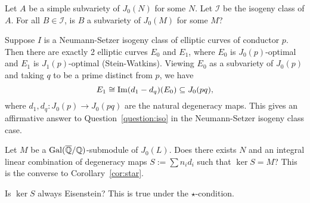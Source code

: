 \documentclass{article}
\begin{document}
\begin{question}
    \label{question:iso}
    Let $A$ be a simple subvariety of $J_0(N)$ for some $N$. Let $\mathcal{I}$
    be the isogeny class of $A$. For all $B\in \mathcal{I}$, is $B$ a
    subvariety of $J_0(M)$ for some $M$?
\end{question}

\begin{example}
    Suppose $I$ is a Neumann-Setzer isogeny class of elliptic curves of
    conductor $p$. Then there are exactly 2 elliptic curves $E_0$ and $E_1$,
    where $E_0$ is $J_0(p)$-optimal and $E_1$ is $J_1(p)$-optimal
    (Stein-Watkins). Viewing $E_0$ as a subvariety of $J_0(p)$ and taking $q$
    to be a prime distinct from $p$, we have
    \[
        E_1 \cong \operatorname{Im} (d_1-d_q)(E_0)\subseteq J_0(pq),
    \]
    where $d_1, d_q:J_0(p)\to J_0(pq)$ are the natural degeneracy maps. This
    gives an affirmative answer to Question~\ref{question:iso} in the
    Neumann-Setzer isogeny class case.
\end{example}


\begin{question}
    Let $M$ be a $\operatorname{Gal}(\overline{\mathbb{Q}}/\mathbb{Q})$-submodule of $J_0(L)$. Does there exists
    $N$ and an integral linear combination of degeneracy maps $S:=\sum n_i d_i$
    such that $\ker S=M$? This is the converse to Corollary~\ref{cor:star}.
\end{question}

\begin{question}
    Is $\ker S$ always Eisenstein? This is true under the $\star$-condition.
\end{question}
\end{document}
